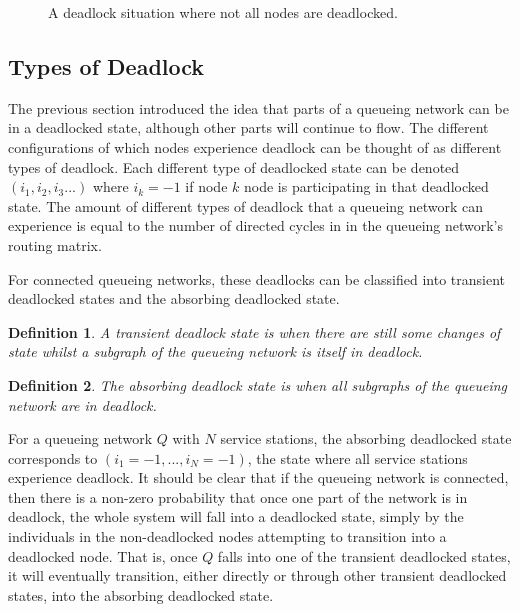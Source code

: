 \documentclass{article}
\newtheorem{definition}{Definition}
\begin{document}
\begin{figure}[H]
  
  \caption{A deadlock situation where not all nodes are deadlocked.}
  \label{fig:somenodes_notdeadlocked}
\end{figure}


\subsection{Types of Deadlock}
The previous section introduced the idea that parts of a queueing network can be in a deadlocked state, although other parts will continue to flow.
The different configurations of which nodes experience deadlock can be thought
of as different types of deadlock.
Each different type of deadlocked state can be denoted $(i_1, i_2, i_3...)$ where $i_k = -1$ if node $k$ node is participating in that deadlocked state.
The amount of different types of deadlock that a queueing network can experience
is equal to the number of directed cycles in in the queueing network's routing
matrix. %

For connected queueing networks, these deadlocks can be classified into transient deadlocked states and the absorbing deadlocked state.\\


\begin{definition}
    A transient deadlock state is when there are still some changes of state
    whilst a subgraph of the queueing network is itself in deadlock.\\
\end{definition}

\begin{definition}
    The absorbing deadlock state is when all subgraphs of the
    queueing network are in deadlock.\\
\end{definition}

For a queueing network $Q$ with $N$ service stations, the absorbing deadlocked state corresponds to $(i_1=-1,...,i_N=-1)$, the state where all service stations experience deadlock.
It should be clear that if the queueing network is connected, then there is a non-zero probability that once one part of the network is in deadlock, the whole system will fall into a deadlocked state, simply by the individuals in the non-deadlocked nodes attempting to transition into a deadlocked node.
That is, once $Q$ falls into one of the transient deadlocked states, it will eventually transition, either directly or through other transient deadlocked states, into the absorbing deadlocked state.
\end{document}
